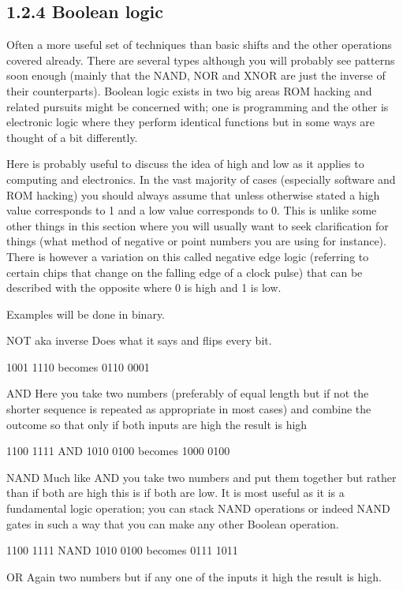 \documentclass[
]{book}
\begin{document}
\hypertarget{boolean-logic}{%
\subsection{1.2.4 Boolean logic}\label{boolean-logic}}

Often a more useful set of techniques than basic shifts and the other operations covered already. There are several types although you will probably see patterns soon enough (mainly that the NAND, NOR and XNOR are just the inverse of their counterparts). Boolean logic exists in two big areas ROM hacking and related pursuits might be concerned with; one is programming and the other is electronic logic where they perform identical functions but in some ways are thought of a bit differently.

Here is probably useful to discuss the idea of high and low as it applies to computing and electronics. In the vast majority of cases (especially software and ROM hacking) you should always assume that unless otherwise stated a high value corresponds to 1 and a low value corresponds to 0. This is unlike some other things in this section where you will usually want to seek clarification for things (what method of negative or point numbers you are using for instance). There is however a variation on this called negative edge logic (referring to certain chips that change on the falling edge of a clock pulse) that can be described with the opposite where 0 is high and 1 is low.

Examples will be done in binary.

NOT aka inverse Does what it says and flips every bit.

1001 1110 becomes 0110 0001

AND Here you take two numbers (preferably of equal length but if not the shorter sequence is repeated as appropriate in most cases) and combine the outcome so that only if both inputs are high the result is high

1100 1111 AND 1010 0100 becomes 1000 0100

NAND Much like AND you take two numbers and put them together but rather than if both are high this is if both are low. It is most useful as it is a fundamental logic operation; you can stack NAND operations or indeed NAND gates in such a way that you can make any other Boolean operation.

1100 1111 NAND 1010 0100 becomes 0111 1011

OR Again two numbers but if any one of the inputs it high the result is high.
\end{document}
